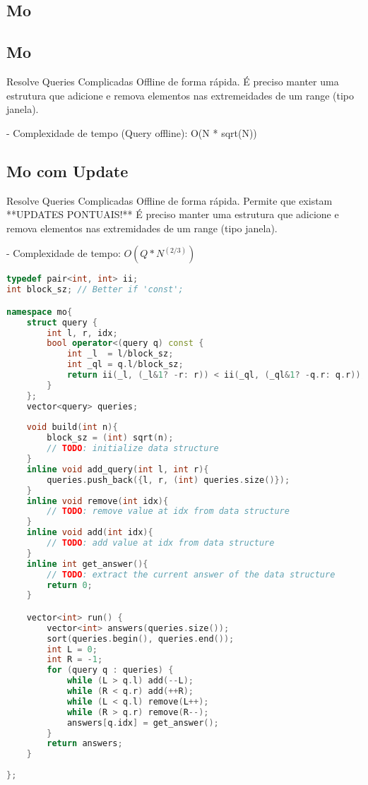\documentclass[11pt, a4paper, twoside]{article}
\begin{document}
\subsection{Mo}

\subsection{Mo}



Resolve Queries Complicadas Offline de forma rápida.  
É preciso manter uma estrutura que adicione e remova elementos nas extremeidades de um range (tipo janela).

- Complexidade de tempo (Query offline): O(N * sqrt(N))

\subsection{Mo com Update}


Resolve Queries Complicadas Offline de forma rápida.   
Permite que existam **UPDATES PONTUAIS!**  
É preciso manter uma estrutura que adicione e remova elementos nas extremidades de um range (tipo janela).

- Complexidade de tempo: $O(Q * N^(2/3))$

\begin{lstlisting}[language=C++]
typedef pair<int, int> ii;
int block_sz; // Better if 'const';

namespace mo{
    struct query {
        int l, r, idx;
        bool operator<(query q) const {
            int _l  = l/block_sz;
            int _ql = q.l/block_sz;
            return ii(_l, (_l&1? -r: r)) < ii(_ql, (_ql&1? -q.r: q.r));
        }
    };
    vector<query> queries;    
    
    void build(int n){
        block_sz = (int) sqrt(n);
        // TODO: initialize data structure        
    }
    inline void add_query(int l, int r){
        queries.push_back({l, r, (int) queries.size()});
    }
    inline void remove(int idx){
        // TODO: remove value at idx from data structure
    }
    inline void add(int idx){
        // TODO: add value at idx from data structure
    }
    inline int get_answer(){
        // TODO: extract the current answer of the data structure
        return 0;
    }

    vector<int> run() {
        vector<int> answers(queries.size());
        sort(queries.begin(), queries.end());
        int L = 0;
        int R = -1;
        for (query q : queries) {
            while (L > q.l) add(--L);
            while (R < q.r) add(++R);
            while (L < q.l) remove(L++);
            while (R > q.r) remove(R--);
            answers[q.idx] = get_answer();
        }
        return answers;
    }
    
};
\end{lstlisting}
\end{document}
